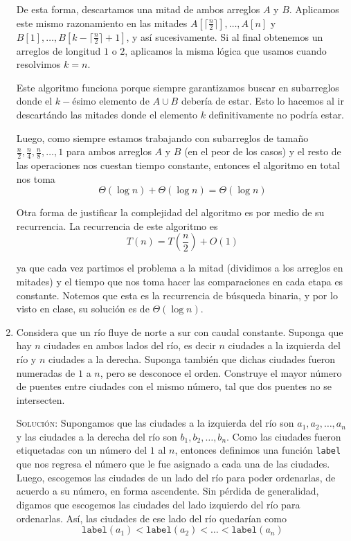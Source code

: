 \documentclass[letterpaper,11pt]{article}
\begin{document}
\begin{enumerate}
    De esta forma, descartamos una mitad de ambos arreglos $A$ y $B$. 
    Aplicamos este mismo razonamiento en las mitades 
    $A[\lceil \frac{n}{2} \rceil], \ldots, A[n]$ y 
    $B[1], \ldots, B[k - \lceil \frac{n}{2} \rceil + 1]$, y así sucesivamente. 
    Si al final obtenemos un arreglos de longitud $1$ o $2$, aplicamos la misma 
    lógica que usamos cuando resolvimos $k=n$.

    Este algoritmo funciona porque siempre garantizamos buscar en subarreglos 
    donde el $k-$ésimo elemento de $A \cup B$ debería de estar. Esto lo 
    hacemos al ir descartándo las mitades donde el elemento $k$ definitivamente 
    no podría estar.

    Luego, como siempre estamos trabajando con subarreglos de tamaño 
    $\frac{n}{2}, \frac{n}{4}, \frac{n}{8}, \ldots, 1$ para ambos arreglos 
    $A$ y $B$ (en el peor de los casos) y el resto de las operaciones nos 
    cuestan tiempo constante, entonces el algoritmo en total nos toma 
    \begin{equation*}
        \Theta(\log n) + \Theta(\log n) = \Theta(\log n)
    \end{equation*}

    Otra forma de justificar la complejidad del algoritmo es por medio de su 
    recurrencia. La recurrencia de este algoritmo es 
    \begin{equation*}
        T(n) = T\left(\frac{n}{2} \right) + O(1)
    \end{equation*}

    ya que cada vez partimos el problema a la mitad (dividimos a los arreglos 
    en mitades) y el tiempo que nos toma hacer las comparaciones en cada etapa
    es constante. Notemos que esta es la recurrencia de búsqueda binaria, y 
    por lo visto en clase, su solución es de $\Theta(\log n)$.

    \item Considera que un río fluye de norte a sur con caudal constante. 
    Suponga que hay $n$ ciudades en ambos lados del río, es decir $n$ ciudades a 
    la izquierda del río y $n$ ciudades a la derecha. Suponga también que dichas 
    ciudades fueron numeradas de $1$ a $n$, pero se desconoce el orden. Construye 
    el mayor número de puentes entre ciudades con el mismo número, tal que dos 
    puentes no se intersecten. 

    \textsc{Solución:} Supongamos que las ciudades a la izquierda del río son 
    $a_1, a_2, \ldots, a_n$ y las ciudades a la derecha del río son $b_1, b_2, 
    \ldots, b_n$. Como las ciudades fueron etiquetadas con un número del $1$ al 
    $n$, entonces definimos una función \texttt{label} que nos regresa el 
    número que le fue asignado a cada una de las ciudades. Luego, escogemos las 
    ciudades de un lado del río para poder ordenarlas, de acuerdo a su número, 
    en forma ascendente. Sin pérdida de generalidad, digamos que escogemos las 
    ciudades del lado izquierdo del río para ordenarlas. Así, las ciudades de 
    ese lado del río quedarían como
    \begin{equation*}
        \texttt{label}(a_1) < \texttt{label}(a_2) < \ldots < \texttt{label}(a_n)
    \end{equation*}


\end{enumerate}
\end{document}
